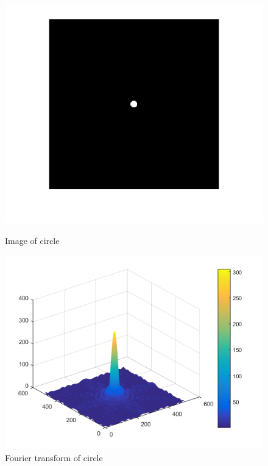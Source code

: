\begin{figure}[H]
	\centering
	\begin{minipage}[t]{0.4\textwidth}
		\includegraphics[width=\textwidth]{images/circle.png}
		\caption{Image of circle}
		\label{fig:bar}
	\end{minipage}
	\begin{minipage}[t]{0.4\textwidth}
		\includegraphics[width=\textwidth]{images/fouriertrafocircle.png}
		\caption{Fourier transform of circle}
		\label{fig:fouriertrafocircle}
	\end{minipage}
\end{figure}

